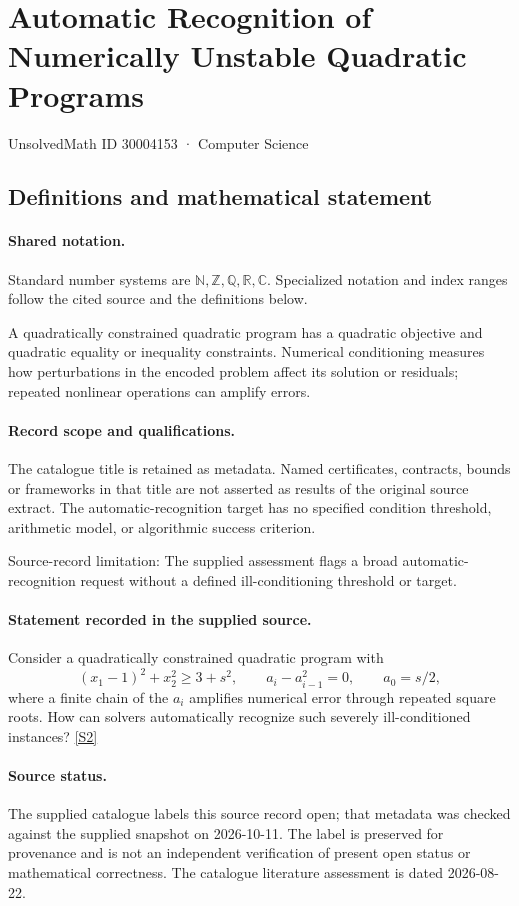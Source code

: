 \documentclass[11pt]{article}
\newcommand{\sref}[2]{\hyperlink{source:#1:#2}{[S#2]}}
\begin{document}
\setcounter{section}{30004152}
\section{Automatic Recognition of Numerically Unstable Quadratic Programs}\label{30004153}
{\small\sffamily UnsolvedMath ID 30004153 · Computer Science}
\subsection{Definitions and mathematical statement}

\paragraph{Shared notation.}Standard number systems are $\mathbb N,\mathbb Z,\mathbb Q,\mathbb R,\mathbb C$. Specialized notation and index ranges follow the cited source and the definitions below.


A quadratically constrained quadratic program has a quadratic objective and quadratic equality or inequality constraints. Numerical conditioning measures how perturbations in the encoded problem affect its solution or residuals; repeated nonlinear operations can amplify errors.
\paragraph{Record scope and qualifications.}
The catalogue title is retained as metadata. Named certificates, contracts, bounds or frameworks in that title are not asserted as results of the original source extract.
The automatic-recognition target has no specified condition threshold, arithmetic model, or algorithmic success criterion.

Source-record limitation: The supplied assessment flags a broad automatic-recognition request without a defined ill-conditioning threshold or target.
\paragraph{Statement recorded in the supplied source.}
Consider a quadratically constrained quadratic program with $$ (x_1-1)^2+x_2^2\geq3+s^2,\qquad a_i-a_{i-1}^2=0,\qquad a_0=s/2,$$ where a finite chain of the $a_i$ amplifies numerical error through repeated square roots. How can solvers automatically recognize such severely ill-conditioned instances? \sref{30004153}{2}
\paragraph{Source status.}
The supplied catalogue labels this source record open; that metadata was checked against the supplied snapshot on 2026-10-11. The label is preserved for provenance and is not an independent verification of present open status or mathematical correctness. The catalogue literature assessment is dated 2026-08-22.
\end{document}
